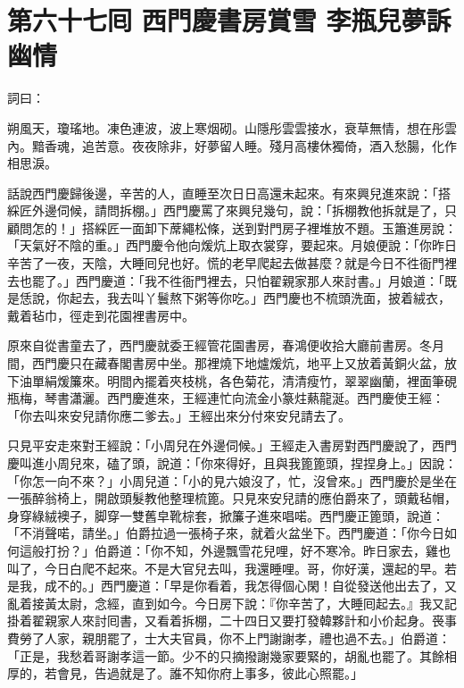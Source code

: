 
\chapter*{第六十七囘 西門慶書房賞雪 李瓶兒夢訴幽情}


詞曰：

\begin{myquote} 
朔風天，瓊瑤地。凍色連波，波上寒烟砌。山隱彤雲雲接水，衰草無情，想在彤雲內。黯香魂，追苦意。夜夜除非，好夢留人睡。殘月高樓休獨倚，酒入愁腸，化作相思淚。

\end{myquote} 

話說西門慶歸後邊，辛苦的人，直睡至次日日高還未起來。有來興兒進來說：「搭綵匠外邊伺候，請問拆棚。」西門慶罵了來興兒幾句，說：「拆棚教他拆就是了，只顧問怎的！」{}搭綵匠一面卸下蓆繩松條，送到對門房子裡堆放不題。玉簫進房說：「天氣好不陰的重。」西門慶令他向煖炕上取衣裳穿，要起來。月娘便說：「你昨日辛苦了一夜，天陰，大睡囘兒也好。慌的老早爬起去做甚麼？就是今日不徃衙門裡去也罷了。」西門慶道：「我不徃衙門裡去，只怕翟親家那人來討書。」月娘道：「既是恁說，你起去，我去叫丫鬟熬下粥等你吃。」西門慶也不梳頭洗面，披着絨衣，戴着毡巾，徑走到花園裡書房中。

原來自從書童去了，西門慶就委王經管花園書房，春鴻便收拾大廳前書房。冬月間，西門慶只在藏春閣書房中坐。那裡燒下地爐煖炕，地平上又放着黃銅火盆，放下油單絹煖簾來。明間內擺着夾枝桃，各色菊花，清清瘦竹，翠翠幽蘭，裡面筆硯瓶梅，琴書瀟灑。西門慶進來，王經連忙向流金小篆炷爇龍涎。西門慶使王經：「你去叫來安兒請你應二爹去。」王經出來分付來安兒請去了。

只見平安走來對王經說：「小周兒在外邊伺候。」王經走入書房對西門慶說了，西門慶叫進小周兒來，磕了頭，說道：「你來得好，且與我篦篦頭，捏捏身上。」因說：「你怎一向不來？」小周兒道：「小的見六娘沒了，忙，沒曾來。」西門慶於是坐在一張醉翁椅上，開啟頭髮教他整理梳篦。只見來安兒請的應伯爵來了，頭戴毡帽，身穿綠絨襖子，脚穿一雙舊皁靴棕套，掀簾子進來唱喏。西門慶正篦頭，說道：「不消聲喏，請坐。」伯爵拉過一張椅子來，就着火盆坐下。西門慶道：「你今日如何這般打扮？」伯爵道：「你不知，外邊飄雪花兒哩，好不寒冷。昨日家去，雞也叫了，今日白爬不起來。不是大官兒去叫，我還睡哩。哥，你好漢，還起的早。若是我，成不的。」{}西門慶道：「早是你看着，我怎得個心閑！自從發送他出去了，又亂着接黃太尉，念經，直到如今。今日房下說：『你辛苦了，大睡囘起去。』我又記掛着翟親家人來討囘書，又看着拆棚，二十四日又要打發韓夥計和小价起身。䘮事費勞了人家，親朋罷了，士大夫官員，你不上門謝謝孝，禮也過不去。」伯爵道：「正是，我愁着哥謝孝這一節。少不的只摘撥謝幾家要緊的，胡亂也罷了。其餘相厚的，若會見，告過就是了。誰不知你府上事多，彼此心照罷。」

